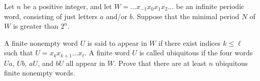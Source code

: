 Let 
$n$
 be a positive integer, and let 
$W = \ldots x_{-1}x_0x_1x_2 \ldots$
 be an infinite periodic word, consisting of just letters 
$a$
 and/or 
$b$.
 Suppose that the minimal period 
$N$
 of 
$W$
 is greater than 
$2^n$.


A finite nonempty word 
$U$
 is said to 
appear
 in 
$W$
 if there exist indices 
$k \leq \ell$
 such that 
$U=x_k x_{k+1} \ldots x_{\ell}$.
 A finite word 
$U$
 is called 
ubiquitous
 if the four words 
$Ua$, 
$Ub$, 
$aU$, 
 and 
$bU$
 all appear in 
$W$.
 Prove that there are at least 
$n$
 ubiquitous finite nonempty words.
